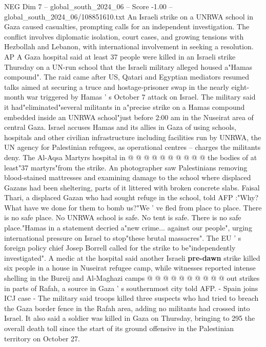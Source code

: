 \begin{textsample}{NEG Dim 7 – global\_south\_2024\_06 – Score -1.00 – global\_south\_2024\_06/108851610.txt}  \label{ex:f7_neg_215}
An Israeli strike on a UNRWA school in Gaza caused casualties, prompting calls for an independent investigation.
The conflict involves diplomatic isolation, court cases, and growing tensions with Hezbollah and Lebanon, with international involvement in seeking a resolution.
AP A Gaza hospital said at least 37 people were killed in an Israeli strike Thursday on a UN-run school that the Israeli military alleged housed a"Hamas compound".
The raid came after US, Qatari and Egyptian mediators resumed talks aimed at securing a truce and hostage-prisoner swap in the nearly eight-month war triggered by Hamas ' s October 7 attack on Israel.
The military said it had"eliminated"several militants in a"precise strike on a Hamas compound embedded inside an UNRWA school"just before 2:00 am in the Nuseirat area of central Gaza.
Israel accuses Hamas and its allies in Gaza of using schools, hospitals and other civilian infrastructure including facilities run by UNRWA, the UN agency for Palestinian refugees, as operational centres -- charges the militants deny.
The Al-Aqsa Martyrs hospital in @ @ @ @ @ @ @ @ @ @ the bodies of at least"37 martyrs"from the strike.
An photographer saw Palestinians removing blood-stained mattresses and examining damage to the school where displaced Gazans had been sheltering, parts of it littered with broken concrete slabs.
Faisal Thari, a displaced Gazan who had sought refuge in the school, told AFP :"Why?
What have we done for them to bomb us?"We ' ve fled from place to place.
There is no safe place.
No UNRWA school is safe.
No tent is safe.
There is no safe place."Hamas in a statement decried a"new crime... against our people", urging international pressure on Israel to stop"these brutal massacres".
The EU ' s foreign policy chief Josep Borrell called for the strike to be"independently investigated".
A medic at the hospital said another Israeli \textbf{pre-dawn} strike killed six people in a house in Nuseirat refugee camp, while witnesses reported intense shelling in the Bureij and Al-Maghazi camps @ @ @ @ @ @ @ @ @ @ out strikes in parts of Rafah, a source in Gaza ' s southernmost city told AFP. - Spain joins ICJ case - The military said troops killed three suspects who had tried to breach the Gaza border fence in the Rafah area, adding no militants had crossed into Israel.
It also said a soldier was killed in Gaza on Thursday, bringing to 295 the overall death toll since the start of its ground offensive in the Palestinian territory on October 27.

\end{textsample}
